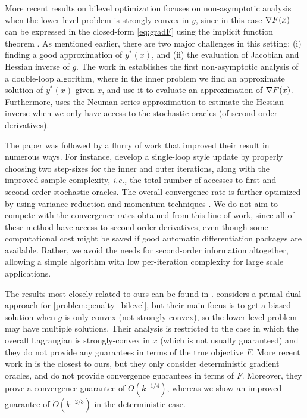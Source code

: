 More recent results on bilevel optimization focuses on non-asymptotic analysis when the lower-level problem is strongly-convex in $y$, since in this case $\nabla F(x)$ can be expressed in the closed-form \eqref{eq:gradF} using the implicit function theorem \cite{couellan2015bi, couellan2016convergence}. As mentioned earlier, there are two major challenges in this setting: (i) finding a good approximation of $y^*(x)$, and (ii) the evaluation of Jacobian and Hessian inverse of $g$. The work in \cite{ghadimi2018approximation} establishes the first non-asymptotic analysis of a double-loop algorithm, where in the inner problem we find an approximate solution of $y^*(x)$ given $x$, and use it to evaluate an approximation of $\nabla F(x)$. Furthermore, \cite{ghadimi2018approximation} uses the Neuman series approximation to estimate the Hessian inverse when we only have access to the stochastic oracles (of second-order derivatives). 





The paper \cite{ghadimi2018approximation} was followed by a flurry of work that improved their result in numerous ways. 
For instance, \cite{hong2020two, chen2021closing, chen2022single, ji2021bilevel} develop a single-loop style update by properly choosing two step-sizes for the inner and outer iterations, along with the improved sample complexity, {\it i.e.,} the total number of accesses to first and second-order stochastic oracles. 
The overall convergence rate is further optimized by using variance-reduction and momentum techniques \cite{khanduri2021near, dagreou2022framework, guo2021randomized, yang2021provably, huang2021biadam}. 
We do not aim to compete with the convergence rates obtained from this line of work, since all of these method have access to second-order derivatives, even though some computational cost might be saved if good automatic differentiation packages \cite{margossian2019review} are available. 
Rather, we avoid the needs for second-order information altogether, allowing a simple algorithm with low per-iteration complexity for large scale applications.

The results most closely related to ours can be found in \cite{ye2022bome, sow2022constrained}. 
\cite{sow2022constrained} considers a primal-dual approach for \eqref{problem:penalty_bilevel}, but their main focus is to get a biased solution when $g$ is only convex (not strongly convex), so the lower-level problem may have multiple solutions. 
Their analysis is restricted to the case in which the overall Lagrangian is strongly-convex in $x$ (which is not usually guaranteed) and they do not provide any guarantees in terms of the true objective $F$. 
More recent work in \cite{ye2022bome} is the closest to ours, but they only consider  deterministic gradient oracles, and do not provide convergence guarantees in terms of $F$. 
Moreover, they  prove a convergence guarantee of $O(k^{-1/4})$, whereas we show an improved guarantee of $\tilde{O}(k^{-2/3})$ in the deterministic case. 





